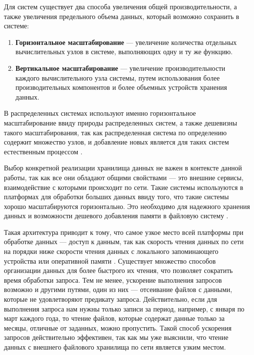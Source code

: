 Для систем существует два способа увеличения общей производительности, а также увеличения предельного объема данных, который возможно сохранить в системе: \cite{Advanced_computer_architecture_and_parallel_processing}
\begin{enumerate}
    \item \textbf{Горизонтальное масштабирование} ---  увеличение количества отдельных вычислительных узлов в системе, выполняющих одну и ту же функцию.
    \item \textbf{Вертикальное масштабирование} --- увеличение производительности каждого вычислительного узла системы, путем использования более производительных компонентов и более объемных устройств хранения данных.
\end{enumerate}

В распределенных системах используют именно горизонтальное масштабирование ввиду природы распределенных систем, а также дешевизны такого масштабирования, так как распределенная система по определению содержит множество узлов, и добавление новых является для таких систем естественным процессом \cite{Advanced_computer_architecture_and_parallel_processing}.

Выбор конкретной реализации хранилища данных не важен в контексте данной работы, так как все они обладают общими свойствами --- это внешние  сервисы, взаимодействие с которыми происходит по сети. Такие системы используются в платформах для обработки больших данных ввиду того, что такие системы хорошо масштабируются горизонтально. Это необходимо для надежного хранения данных и возможности дешевого добавления памяти в файловую систему \cite{Distributed_File_Systems_Architectures}.

Такая архитектура приводит к тому, что самое узкое место всей платформы при обработке данных --- доступ к данным, так как скорость чтения данных по сети на порядки ниже скорости чтения данных с локального запоминающего устройства или оперативной памяти \cite{HOI_BigData}. Существует множество способов организации данных для более быстрого их чтения, что позволяет сократить время обработки запроса. Тем не менее, ускорение выполнения запросов возможно и другими путями, один из них --- отсеивание файлов с данными, которые не удовлетворяют предикату запроса. Действительно, если для выполнения запроса нам нужны только записи за период, например, с января по март каждого года, то чтение файлов, которые содержат данные только за месяцы, отличные от заданных, можно пропустить. Такой способ ускорения запросов действительно эффективен, так как мы уже выяснили, что чтение данных с внешнего файлового хранилища по сети является узким местом.

